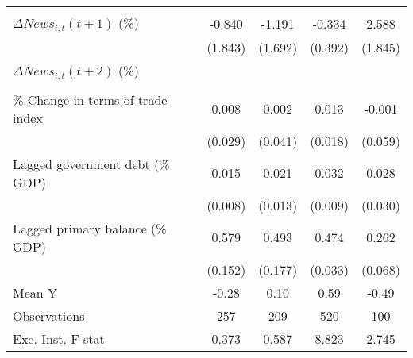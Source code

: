 {\begin{tabular}{l*{4}{c}}
                    &                     &                     &                     &                     \\
\addlinespace
$ \Delta News_{i,t}(t+1)$ (\%)&      -0.840         &      -1.191         &      -0.334         &       2.588         \\
                    &     (1.843)         &     (1.692)         &     (0.392)         &     (1.845)         \\
\addlinespace
$ \Delta News_{i,t}(t+2)$ (\%)&                     &                     &                     &                     \\
                    &                     &                     &                     &                     \\
\addlinespace
\% Change in terms-of-trade index&       0.008         &       0.002         &       0.013         &      -0.001         \\
                    &     (0.029)         &     (0.041)         &     (0.018)         &     (0.059)         \\
\addlinespace
Lagged government debt (\% GDP)&       0.015\sym{*}  &       0.021\sym{*}  &       0.032\sym{***}&       0.028         \\
                    &     (0.008)         &     (0.013)         &     (0.009)         &     (0.030)         \\
\addlinespace
Lagged primary balance (\% GDP)&       0.579\sym{***}&       0.493\sym{***}&       0.474\sym{***}&       0.262\sym{***}\\
                    &     (0.152)         &     (0.177)         &     (0.033)         &     (0.068)         \\
\midrule
Mean Y              &       -0.28         &        0.10         &        0.59         &       -0.49         \\
Observations        &         257         &         209         &         520         &         100         \\
Exc. Inst. F-stat   &       0.373         &       0.587         &       8.823         &       2.745         \\
\bottomrule
\end{tabular}
}
